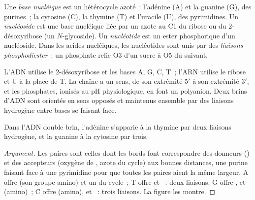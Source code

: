 \begin{definition}[Nucléotides]\label{def:b2:biomolecules:nucleotide}
Une \emph{base nucléique} est un hétérocycle azoté~: l'adénine (A) et
la guanine (G), des purines~; la cytosine (C), la thymine (T) et l'uracile (U), des pyrimidines. Un
\emph{nucléoside} est une base nucléique liée par un azote au C1 du ribose
ou du 2-désoxyribose (un $N$-glycoside). Un \emph{nucléotide} est un ester
phosphorique d'un nucléoside. Dans les acides nucléiques, les nucléotides sont unis par des \emph{liaisons
phosphodiester}~: un phosphate relie O3 d'un sucre à O5 du suivant.
\end{definition}

L'ADN utilise le 2-désoxyribose et les bases A, G, C, T~; l'ARN utilise le ribose et U à la place de T. La
chaîne a un sens, de son extrémité 5$'$ à son extrémité 3$'$, et les phosphates, ionisés au pH
physiologique, en font un polyanion. Deux brins d'ADN sont orientés en sens opposés et maintenus
ensemble par des liaisons hydrogène entre bases se faisant face.

\begin{proposition}\label{prop:b2:biomolecules:pairing}
Dans l'ADN double brin, l'adénine s'apparie à la thymine par deux liaisons hydrogène, et la guanine à la
cytosine par trois.
\end{proposition}

\begin{proof}[Argument]
Les paires sont celles dont les bords font correspondre des donneurs () et des accepteurs
(oxygène de , azote du cycle) aux bonnes distances, une purine faisant face à une pyrimidine pour
que toutes les paires aient la même largeur. A offre  (son groupe amino) et un  du cycle~;
T offre  et ~: deux liaisons. G offre ,  et  (amino)~; C offre
 (amino),  et ~: trois liaisons. La figure les montre.
\end{proof}

